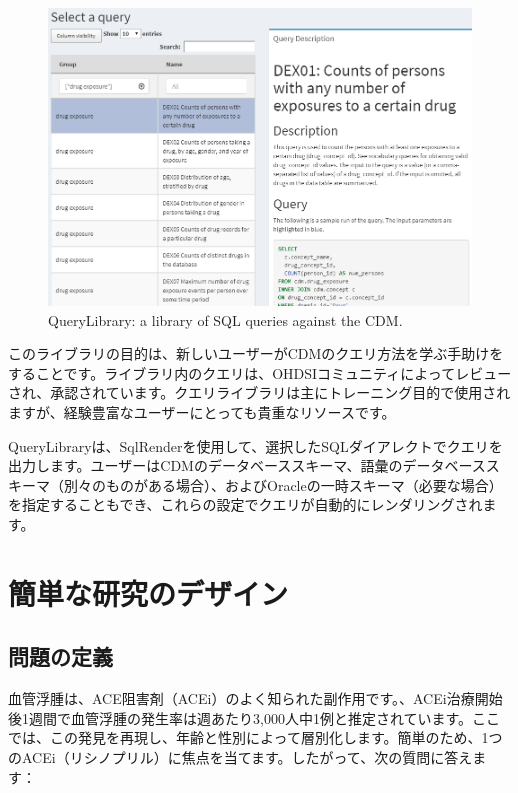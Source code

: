 \documentclass[
  11pt]{book}
\theoremstyle{definition}
\theoremstyle{definition}
\theoremstyle{definition}
\theoremstyle{definition}
\theoremstyle{remark}
\begin{document}
\begin{figure}

{\centering \includegraphics[width=1\linewidth]{images/SqlAndR/queryLibrary} 

}

\caption{QueryLibrary: a library of SQL queries against the CDM.}\label{fig:queryLibrary}
\end{figure}

このライブラリの目的は、新しいユーザーがCDMのクエリ方法を学ぶ手助けをすることです。ライブラリ内のクエリは、OHDSIコミュニティによってレビューされ、承認されています。クエリライブラリは主にトレーニング目的で使用されますが、経験豊富なユーザーにとっても貴重なリソースです。

QueryLibraryは、SqlRenderを使用して、選択したSQLダイアレクトでクエリを出力します。ユーザーはCDMのデータベーススキーマ、語彙のデータベーススキーマ（別々のものがある場合）、およびOracleの一時スキーマ（必要な場合）を指定することもでき、これらの設定でクエリが自動的にレンダリングされます。

\section{簡単な研究のデザイン}\label{ux7c21ux5358ux306aux7814ux7a76ux306eux30c7ux30b6ux30a4ux30f3}

\subsection{問題の定義}\label{ux554fux984cux306eux5b9aux7fa9}

血管浮腫は、ACE阻害剤（ACEi）のよく知られた副作用です。\citet{slater_1988によると}、ACEi治療開始後1週間で血管浮腫の発生率は週あたり3,000人中1例と推定されています。ここでは、この発見を再現し、年齢と性別によって層別化します。簡単のため、1つのACEi（リシノプリル）に焦点を当てます。したがって、次の質問に答えます：
\end{document}

